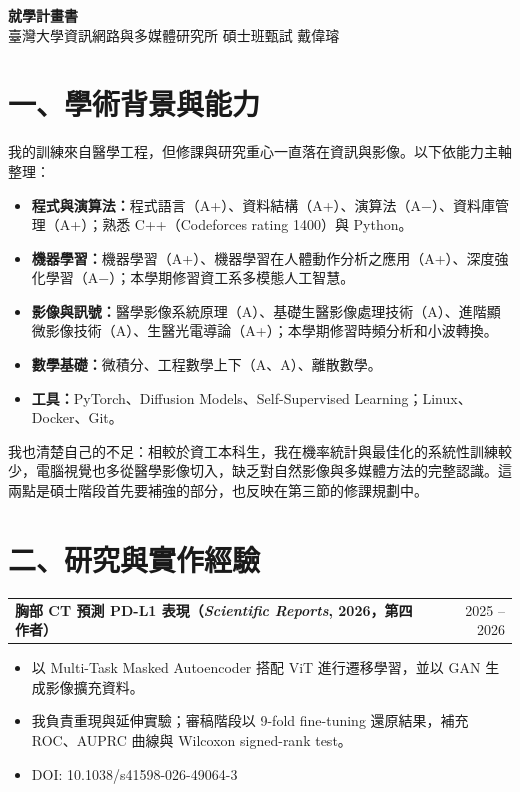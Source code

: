 \documentclass[11pt]{article}
\makeatletter
\newcommand{\entry}[2]{%
  \par\noindent
  \begin{tabularx}{\textwidth}{@{}X r@{}}
    \textbf{#1} & #2
  \end{tabularx}\par}
\makeatother
\begin{document}
\begin{center}
  {\LARGE\bfseries 就學計畫書}\\[4pt]
  臺灣大學資訊網路與多媒體研究所 碩士班甄試 \quad 戴偉璿
\end{center}

\section*{一、學術背景與能力}
我的訓練來自醫學工程，但修課與研究重心一直落在資訊與影像。以下依能力主軸整理：
\begin{itemize}
  \item \textbf{程式與演算法：}程式語言（A+）、資料結構（A+）、演算法（A$-$）、資料庫管理（A+）；熟悉 C++（Codeforces rating 1400）與 Python。
  \item \textbf{機器學習：}機器學習（A+）、機器學習在人體動作分析之應用（A+）、深度強化學習（A$-$）；本學期修習資工系多模態人工智慧。
  \item \textbf{影像與訊號：}醫學影像系統原理（A）、基礎生醫影像處理技術（A）、進階顯微影像技術（A）、生醫光電導論（A+）；本學期修習時頻分析和小波轉換。
  \item \textbf{數學基礎：}微積分、工程數學上下（A、A）、離散數學。
  \item \textbf{工具：}PyTorch、Diffusion Models、Self-Supervised Learning；Linux、Docker、Git。
\end{itemize}

我也清楚自己的不足：相較於資工本科生，我在機率統計與最佳化的系統性訓練較少，電腦視覺也多從醫學影像切入，缺乏對自然影像與多媒體方法的完整認識。這兩點是碩士階段首先要補強的部分，也反映在第三節的修課規劃中。

\section*{二、研究與實作經驗}

\entry{胸部 CT 預測 PD-L1 表現（\textit{Scientific Reports}, 2026，第四作者）}{2025 -- 2026}
\begin{itemize}
  \item 以 Multi-Task Masked Autoencoder 搭配 ViT 進行遷移學習，並以 GAN 生成影像擴充資料。
  \item 我負責重現與延伸實驗；審稿階段以 9-fold fine-tuning 還原結果，補充 ROC、AUPRC 曲線與 Wilcoxon signed-rank test。
  \item DOI: 10.1038/s41598-026-49064-3
\end{itemize}
\end{document}
